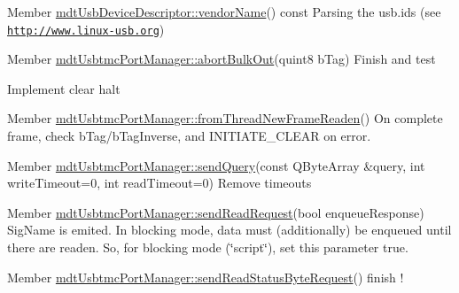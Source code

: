 \label{todo__todo000030}
\hypertarget{todo__todo000030}{}
 
\begin{DoxyDescription}
\item[Member \hyperlink{classmdt_usb_device_descriptor_ac2f746ebd5540b65bf00f82c991f5c3b}{mdtUsbDeviceDescriptor::vendorName}() const  ]Parsing the usb.ids (see \href{http://www.linux-usb.org}{\tt http://www.linux-\/usb.org}) 
\end{DoxyDescription}

\label{todo__todo000038}
\hypertarget{todo__todo000038}{}
 
\begin{DoxyDescription}
\item[Member \hyperlink{classmdt_usbtmc_port_manager_af412ba1b1e7e56ebecd2e59cb6bf607a}{mdtUsbtmcPortManager::abortBulkOut}(quint8 bTag) ]Finish and test 

Implement clear halt 
\end{DoxyDescription}

\label{todo__todo000040}
\hypertarget{todo__todo000040}{}
 
\begin{DoxyDescription}
\item[Member \hyperlink{classmdt_usbtmc_port_manager_aca42b343ae1f6a324e6e45968f03bbea}{mdtUsbtmcPortManager::fromThreadNewFrameReaden}() ]On complete frame, check bTag/bTagInverse, and INITIATE\_\-CLEAR on error. 
\end{DoxyDescription}

\label{todo__todo000036}
\hypertarget{todo__todo000036}{}
 
\begin{DoxyDescription}
\item[Member \hyperlink{classmdt_usbtmc_port_manager_a858590909ce63319a3390140c4d0a6ca}{mdtUsbtmcPortManager::sendQuery}(const QByteArray \&query, int writeTimeout=0, int readTimeout=0) ]Remove timeouts 
\end{DoxyDescription}

\label{todo__todo000041}
\hypertarget{todo__todo000041}{}
 
\begin{DoxyDescription}
\item[Member \hyperlink{classmdt_usbtmc_port_manager_ab1604a1c8f2e9192714d039dbf9a5158}{mdtUsbtmcPortManager::sendReadRequest}(bool enqueueResponse) ]SigName is emited. In blocking mode, data must (additionally) be enqueued until there are readen. So, for blocking mode (\char`\"{}script\char`\"{}), set this parameter true. 
\end{DoxyDescription}

\label{todo__todo000037}
\hypertarget{todo__todo000037}{}
 
\begin{DoxyDescription}
\item[Member \hyperlink{classmdt_usbtmc_port_manager_a7bcc280bd4a26ed523832550b1e61553}{mdtUsbtmcPortManager::sendReadStatusByteRequest}() ]finish ! 
\end{DoxyDescription}